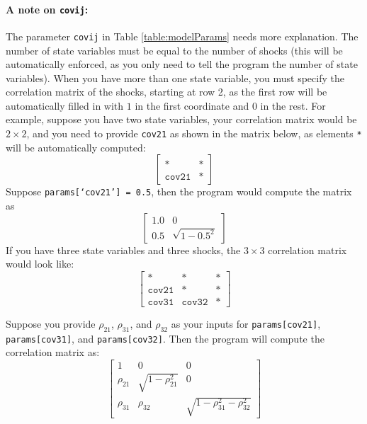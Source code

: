 \documentclass[12pt]{article}
\begin{document}
\paragraph{A note on \texttt{covij}:}\label{covParam} The parameter \texttt{covij} in Table \ref{table:modelParams} needs more explanation. The number of state variables must be equal to the number of shocks (this will be automatically enforced, as you only need to tell the program the number of state variables). When you have more than one state variable, you must specify the correlation matrix of the shocks, starting at row 2, as the first row will be automatically filled in with $1$ in the first coordinate and $0$ in the rest. For example, suppose you have two state variables, your correlation matrix would be $2 \times 2$, and you need to provide \texttt{cov21} as shown in the matrix below, as elements \texttt{*} will be automatically computed:
\[
\begin{bmatrix}
    \texttt{*} &  \texttt{*} \\
    \texttt{cov21} & \texttt{*} 
\end{bmatrix}
\]
Suppose \texttt{params[`cov21'] = 0.5}, then the program would compute the matrix as
\[
\begin{bmatrix}
    1.0 &  0 \\
    0.5 & \sqrt{1 - 0.5^2}
\end{bmatrix}
\]
If you have three state variables and three shocks, the $3 \times 3$ correlation matrix would look like: \\
\[
\begin{bmatrix}
    \texttt{*} &  \texttt{*} & \texttt{*}  \\
    \texttt{cov21} & \texttt{*} & \texttt{*} \\
     \texttt{cov31}  &  \texttt{cov32}  & \texttt{*} 
\end{bmatrix}
\]

Suppose you provide $\rho_{21}$, $\rho_{31}$, and $\rho_{32}$ as your inputs for \texttt{params[cov21]}, \texttt{params[cov31]}, and \texttt{params[cov32]}. Then the program will compute the correlation matrix as:
\[
\begin{bmatrix}
    1 &  0 & 0  \\
    \rho_{21} & \sqrt{1 -\rho_{21}^2} & 0 \\
     \rho_{31}  &  \rho_{32} &  \sqrt{1 -\rho_{31}^2 - \rho_{32}^2} 
\end{bmatrix}
\]
\end{document}
